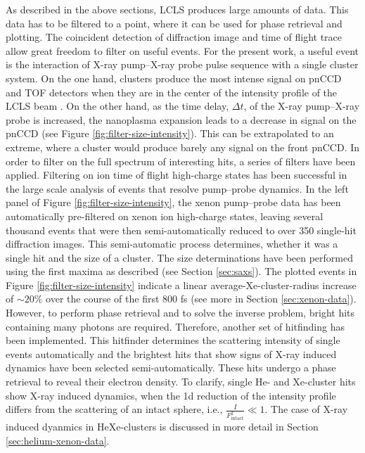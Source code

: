 As described in the above sections, LCLS produces large amounts of data. This data has to be filtered to a point, where it can be used for phase retrieval and plotting. The coincident detection of diffraction image and time of flight trace allow great freedom to filter on useful events. For the present work, a useful event is the interaction of X-ray pump--X-ray probe pulse sequence with a single cluster system. On the one hand, clusters produce the most intense signal on pnCCD and TOF detectors when they are in the center of the intensity profile of the LCLS beam \citep{Gorkhover-2012-PRL}. On the other hand, as the time delay, $\Delta t$, of the X-ray pump--X-ray probe is increased, the nanoplasma expansion leads to a decrease in signal on the pnCCD (see Figure \ref{fig:filter-size-intensity}). This can be extrapolated to an extreme, where a cluster would produce barely any signal on the front pnCCD. In order to filter on the full spectrum of interesting hits, a series of filters have been applied. Filtering on ion time of flight high-charge states has been successful in the large scale analysis of events that resolve pump--probe dynamics. In the left panel of Figure \ref{fig:filter-size-intensity}, the xenon pump--probe data has been automatically pre-filtered on xenon ion high-charge states, leaving several thousand events that were then semi-automatically reduced to over 350 single-hit diffraction images. This semi-automatic process determines, whether it was a single hit and the size of a cluster. The size determinations have been performed using the first maxima as described (see Section \ref{sec:saxs}). The plotted events in Figure \ref{fig:filter-size-intensity} indicate a linear average-Xe-cluster-radius increase of $\sim 20\%$ over the course of the first 800 fs (see more in Section \ref{sec:xenon-data}). However, to perform phase retrieval and to solve the inverse problem, bright hits containing many photons are required. Therefore, another set of hitfinding has been implemented. This hitfinder determines the scattering intensity of single events automatically and the brightest hits that show signs of X-ray induced dynamics have been selected semi-automatically. These hits undergo a phase retrieval to reveal their electron density. To clarify, single He- and Xe-cluster hits show X-ray induced dynamics, when the 1d reduction of the intensity profile differs from the scattering of an intact sphere, i.e., $\tfrac{I}{F_{\text{intact}}^{2}} \ll 1$. The case of X-ray induced dyanmics in HeXe-clusters is discussed in more detail in Section \ref{sec:helium-xenon-data}.
%
%
%